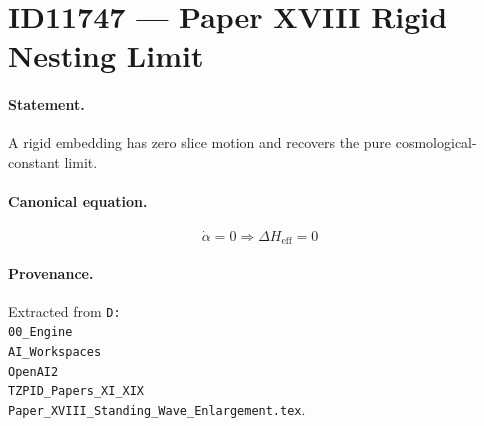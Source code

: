 \section*{ID11747 --- Paper XVIII Rigid Nesting Limit}

\paragraph{Statement.}
A rigid embedding has zero slice motion and recovers the pure cosmological-constant limit.

\paragraph{Canonical equation.}
\[
\dot\alpha=0\Rightarrow\Delta H_{\mathrm{eff}}=0
\]

\paragraph{Provenance.}
Extracted from \texttt{D:\\00\_Engine\\AI\_Workspaces\\OpenAI2\\TZPID\_Papers\_XI\_XIX\\Paper\_XVIII\_Standing\_Wave\_Enlargement.tex}.
